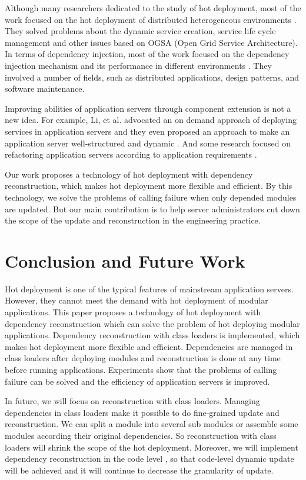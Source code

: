 \documentclass[conference]{IEEEtran}
\begin{document}
Although many researchers dedicated to the study of hot deployment, most of the work focused on the hot deployment of distributed heterogeneous environments \cite{related_hot_2, related_hot_3, related_hot_4}.
They solved problems about the dynamic service creation, service life cycle management and other issues based on OGSA (Open Grid Service Architecture).
In terms of dependency injection, most of the work focused on the dependency injection mechanism and its performance in different environments \cite{related_DI_1, related_DI_2}.
They involved a number of fields, such as distributed applications, design patterns, and software maintenance.

Improving abilities of application servers through component extension is not a new idea.
For example, Li, et al. advocated an on demand approach of deploying services in application servers \cite{related_AS_1} and they even proposed an approach to make an application server well-structured and dynamic \cite{related_AS_2}.
And some research focused on refactoring application servers according to application requirements \cite{related_AS_3, related_AS_4}.

Our work proposes a technology of hot deployment with dependency reconstruction, which makes hot deployment more flexible and efficient.
By this technology, we solve the problems of calling failure when only depended modules are updated. 
But our main contribution is to help server administrators cut down the scope of the update and reconstruction in the engineering practice.


\section{Conclusion and Future Work\label{sec:conclusion}}
Hot deployment is one of the typical features of mainstream application servers.
However, they cannot meet the demand with hot deployment of modular applications.
This paper proposes a technology of hot deployment with dependency reconstruction which can solve the problem of hot deploying modular applications.
Dependency reconstruction with class loaders is implemented, which makes hot deployment more flexible and efficient.
Dependencies are managed in class loaders after deploying modules and reconstruction is done at any time before running applications. 
Experiments show that the problems of calling failure can be solved and the efficiency of application servers is improved.

In future, we will focus on reconstruction with class loaders.
Managing dependencies in class loaders make it possible to do fine-grained update and reconstruction.
We can split a module into several sub modules \cite{related_split} or assemble some modules \cite{related_merge} according their original dependencies.
So reconstruction with class loaders will shrink the scope of the hot deployment.
Moreover, we will implement dependency reconstruction in the code level \cite{future_Gu}, so that code-level dynamic update will be achieved and it will continue to decrease the granularity of update.
\end{document}
